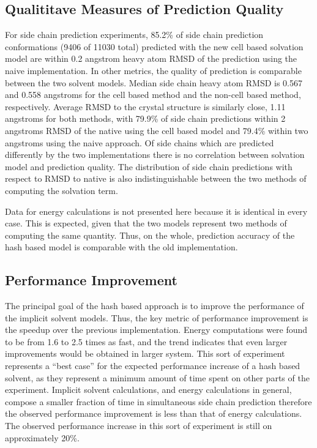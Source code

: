 \subsection*{Qualititave Measures of Prediction Quality}
\label{subsec:results_quality}

For side chain prediction experiments, 85.2\% of side chain prediction conformations (9406 of 11030 total) predicted with the new cell based solvation model are within 0.2 angstrom heavy atom RMSD of the prediction using the naive implementation.
In other metrics, the quality of prediction is comparable between the two solvent models. 
Median side chain heavy atom RMSD is 0.567 and 0.558 angstroms for the cell based method and the non-cell based method, respectively.
Average RMSD to the crystal structure is similarly close, 1.11 angstroms for both methods, with 79.9\% of side chain predictions within 2 angstroms RMSD of the native using the cell based model and 79.4\% within two angstroms using the naive approach.
Of side chains which are predicted differently by the two implementations there is no correlation between solvation model and prediction quality.
The distribution of side chain predictions with respect to RMSD to native is also indistinguishable between the two methods of computing the solvation term.

Data for energy calculations is not presented here because it is identical in every case.
This is expected, given that the two models represent two methods of computing the same quantity.
Thus, on the whole, prediction accuracy of the hash based model is comparable with the old implementation.

\subsection*{Performance Improvement}
\label{subsec:performance_improvement}
The principal goal of the hash based approach is to improve the performance of the implicit solvent models. 
Thus, the key metric of performance improvement is the speedup over the previous implementation.
Energy computations were found to be from 1.6 to 2.5 times as fast, and the trend indicates that even larger improvements would be obtained in larger system.
This sort of experiment represents a ``best case'' for the expected performance increase of a hash based solvent, as they represent a minimum amount of time spent on other parts of the experiment.
Implicit solvent calculations, and energy calculations in general, compose a smaller fraction of time in simultaneous side chain prediction therefore the observed performance improvement is less than that of energy calculations.
The observed performance increase in this sort of experiment is still on approximately 20\%.

